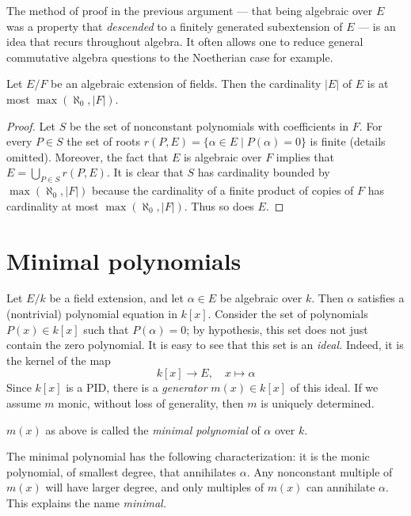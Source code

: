 \noindent
The method of proof in the previous argument --- that being algebraic
over $E$ was a property that {\it descended} to a finitely generated
subextension of $E$ --- is an idea that recurs throughout algebra.
It often allows one to reduce general commutative algebra questions
to the Noetherian case for example.

\begin{lemma}
\label{lemma-size-algebraic-extension}
Let $E/F$ be an algebraic extension of fields. Then the cardinality $|E|$
of $E$ is at most $\max(\aleph_0, |F|)$.
\end{lemma}

\begin{proof}
Let $S$ be the set of nonconstant polynomials with coefficients in $F$.
For every $P \in S$ the set of roots
$r(P, E) = \{\alpha \in E \mid P(\alpha) = 0\}$
is finite (details omitted). Moreover, the fact that $E$ is algebraic
over $F$ implies that $E = \bigcup_{P \in S} r(P, E)$.
It is clear that $S$ has cardinality bounded by $\max(\aleph_0, |F|)$
because the cardinality of a finite product of copies of $F$ has
cardinality at most $\max(\aleph_0, |F|)$.
Thus so does $E$.
\end{proof}


\section{Minimal polynomials}
\label{section-minimal-polynomials}

\noindent
Let $E/k$ be a field extension, and let $\alpha \in E$ be algebraic over $k$.
Then $\alpha$ satisfies a (nontrivial) polynomial equation in $k[x]$.
Consider the set of polynomials $P(x) \in k[x]$ such that $P(\alpha) = 0$; by
hypothesis, this set does not just contain the zero polynomial.
It is easy to see that this set is an {\it ideal.} Indeed, it is the kernel
of the map
$$
k[x] \to E, \quad x \mapsto \alpha
$$
Since $k[x]$ is a PID, there is a {\it generator} $m(x) \in k[x]$ of this
ideal. If we assume $m$ monic, without loss of generality, then $m$ is
uniquely determined.

\begin{definition}
\label{definition-minimal-polynomial}
$m(x)$ as above is called the {\it minimal polynomial} of $\alpha$ over $k$.
\end{definition}

\noindent
The minimal polynomial has the following characterization: it is the monic
polynomial, of smallest degree, that annihilates $\alpha$. Any nonconstant
multiple of $m(x)$ will have larger degree, and only multiples of $m(x)$ can
annihilate $\alpha$. This explains the name {\it minimal.}

